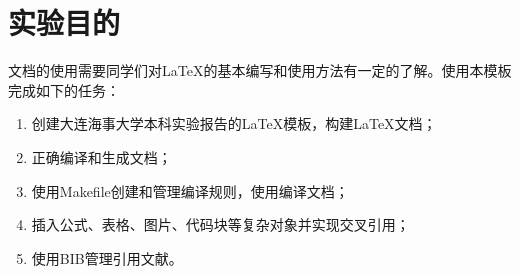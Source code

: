 \section{实验目的}

文档的使用需要同学们对\LaTeX 的基本编写和使用方法有一定的了解。使用本模板完成如下的任务：

\begin{enumerate}
    \item 创建大连海事大学本科实验报告的\LaTeX 模板，构建\LaTeX 文档；
    \item 正确编译和生成文档；
    \item 使用Makefile创建和管理编译规则，使用\XeLaTeX 编译文档；
    \item 插入公式、表格、图片、代码块等复杂对象并实现交叉引用；
    \item 使用BIB管理引用文献。
\end{enumerate}
